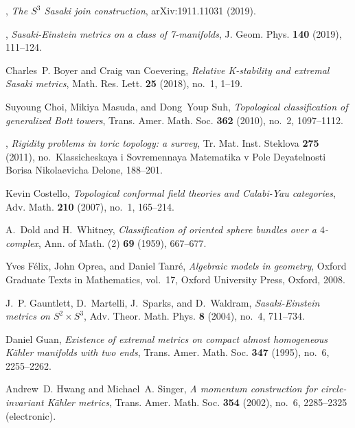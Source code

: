 \documentclass[12pt]{amsart}
\begin{document}
\begin{thebibliography}{ACGTF08}
\bysame, \emph{The ${S}^3$ {S}asaki join construction}, arXiv:1911.11031
  (2019).

\bysame, \emph{Sasaki-{E}instein metrics on a class of 7-manifolds}, J. Geom.
  Phys. \textbf{140} (2019), 111--124. 

Charles~P. Boyer and Craig van Coevering, \emph{Relative {K}-stability and
  extremal {S}asaki metrics}, Math. Res. Lett. \textbf{25} (2018), no.~1,
  1--19. 

Suyoung Choi, Mikiya Masuda, and Dong~Youp Suh, \emph{Topological
  classification of generalized {B}ott towers}, Trans. Amer. Math. Soc.
  \textbf{362} (2010), no.~2, 1097--1112. 

\bysame, \emph{Rigidity problems in toric topology: a survey}, Tr. Mat. Inst.
  Steklova \textbf{275} (2011), no.~Klassicheskaya i Sovremennaya Matematika v
  Pole Deyatelnosti Borisa Nikolaevicha Delone, 188--201. 

Kevin Costello, \emph{Topological conformal field theories and {C}alabi-{Y}au
  categories}, Adv. Math. \textbf{210} (2007), no.~1, 165--214. 

A.~Dold and H.~Whitney, \emph{Classification of oriented sphere bundles over a
  {$4$}-complex}, Ann. of Math. (2) \textbf{69} (1959), 667--677. 

Yves F{\'e}lix, John Oprea, and Daniel Tanr{\'e}, \emph{Algebraic models in
  geometry}, Oxford Graduate Texts in Mathematics, vol.~17, Oxford University
  Press, Oxford, 2008. 

J.~P. Gauntlett, D.~Martelli, J.~Sparks, and D.~Waldram,
  \emph{Sasaki-{E}instein metrics on {$S^2\times S^3$}}, Adv. Theor. Math.
  Phys. \textbf{8} (2004), no.~4, 711--734. 

Daniel Guan, \emph{Existence of extremal metrics on compact almost homogeneous
  {K}\"ahler manifolds with two ends}, Trans. Amer. Math. Soc. \textbf{347}
  (1995), no.~6, 2255--2262. 

Andrew~D. Hwang and Michael~A. Singer, \emph{A momentum construction for
  circle-invariant {K}\"ahler metrics}, Trans. Amer. Math. Soc. \textbf{354}
  (2002), no.~6, 2285--2325 (electronic). 


\end{thebibliography}
\end{document}
